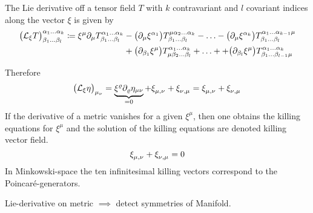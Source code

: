 \begin{definition}
    The Lie derivative off a tensor field $T$ with $k$ contravariant and $l$ covariant indices along the vector $\xi$ is given by
    \begin{equation}
        \begin{split}
            \left( \liedif{\xi}{T} \right)^{\alpha_1\ldots\alpha_k}_{\beta_1\ldots\beta_l}
            \coloneqq \xi^\mu \partial_\mu T^{\alpha_1\ldots\alpha_k}_{\beta_1\ldots\beta_l}
            & - \left( \partial_\mu \xi^{\alpha_1} \right) T^{\mu\alpha_2\ldots\alpha_k}_{\beta_1\ldots\beta_l} - \ldots
            - \left( \partial_\mu \xi^{\alpha_k} \right) T^{\alpha_1\ldots\alpha_{k-1}\mu}_{\beta_1\ldots\beta_l} \\
            & + \left( \partial_{\beta_1} \xi^\mu \right) T^{\alpha_1\ldots\alpha_k}_{\mu\beta_2\ldots\beta_l} + \ldots
            + + \left( \partial_{\beta_l} \xi^\mu \right) T^{\alpha_1\ldots\alpha_k}_{\beta_1\ldots\beta_{l-1}\mu}
        \end{split}
    \end{equation}
\end{definition}
Therefore
\begin{equation}
    \left( \liedif{\xi}{\eta} \right)_{\mu_\nu} = \underbrace{\xi^\varrho\partial_\varrho\eta_{\mu\nu}}_{=0}
    + \tensor{\xi}{_\mu_,_\nu} + \tensor{\xi}{_\nu_,_\mu} = \tensor{\xi}{_\mu_,_\nu} + \tensor{\xi}{_\nu_,_\mu}
\end{equation}
If the derivative of a metric vanishes for a given $\xi^\mu$, then one obtains the killing equations for $\xi^\mu$ and the solution of the
killing equations are denoted killing vector field.
\begin{equation}
    \tensor{\xi}{_\mu_,_\nu} + \tensor{\xi}{_\nu_,_\mu}=0  %
\end{equation}
In Minkowski-space the ten infinitesimal killing vectors correspond to the Poincaré-generators.
\begin{sidenote}
Lie-derivative on metric $\implies$ detect symmetries of Manifold.
\end{sidenote}
